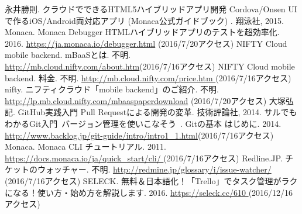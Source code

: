 \documentclass[openany,11pt,papersize]{jsbook}
\begin{document}
%
\maketitle

\frontmatter



\tableofcontents%


\mainmatter%


%







%

%





\begin{appendix}







\end{appendix}



\begin{thebibliography}{10}
 永井勝則. クラウドでできるHTML5ハイブリッドアプリ開発 Cordova/Onsen UIで作るiOS/Android両対応アプリ (Monaca公式ガイドブック) . 翔泳社, 2015.
 Monaca. Monaca Debugger HTMLハイブリッドアプリのテストを超効率化. 2016. \url{https://ja.monaca.io/debugger.html} (2016/7/20アクセス)
 NIFTY Cloud mobile backend. mBaaSとは. 不明. \url{http://mb.cloud.nifty.com/about.htm}(2016/7/16アクセス)
 NIFTY Cloud mobile backend. 料金. 不明. \url{http://mb.cloud.nifty.com/price.htm }(2016/7/16アクセス)
 nifty. ニフティクラウド「mobile backend」のご紹介. 不明. \url{http://lp.mb.cloud.nifty.com/mbaaspaperdownload} (2016/7/20アクセス)
 大塚弘記. GitHub実践入門 Pull Requestによる開発の変革. 技術評論社, 2014.
 サルでもわかるGit入門~バージョン管理を使いこなそう~. Gitの基本 はじめに. 2014. \url{http://www.backlog.jp/git-guide/intro/intro1_1.html}(2016/7/16アクセス)
 Monaca. Monaca CLI チュートリアル. 2011. \url{https://docs.monaca.io/ja/quick_start/cli/ }(2016/7/16アクセス)
 Redline.JP. チケットのウォッチャー. 不明. \url{http://redmine.jp/glossary/i/issue-watcher/ }(2016/7/16アクセス)
 SELECK. 無料＆日本語化！「Trello」でタスク管理がラクになる！使い方・始め方を解説します. 2016. \url{https://seleck.cc/610 }(2016/12/16アクセス)
\end{thebibliography}
\end{document}
